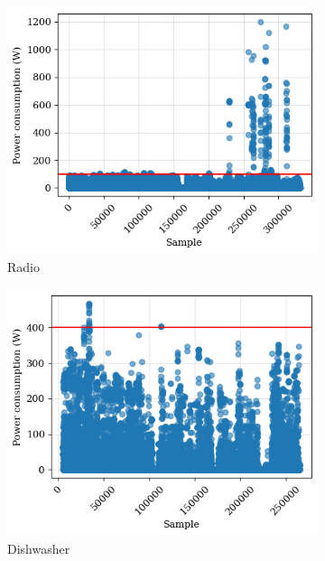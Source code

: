 

\begin{figure}
  \begin{subfigure}{.5\textwidth}
    \centering
    \includegraphics[width=.9\linewidth]{images/raw_consumptions/audio_amplifier.png}
    \caption{Radio}
    \label{fig:radio}
  \end{subfigure}%
  \begin{subfigure}{.5\textwidth}
    \centering
    \includegraphics[width=.9\linewidth]{images/raw_consumptions/dish_washer.png}
    \caption{Dishwasher}
    \label{fig:dish_washer}
  \end{subfigure}
  \begin{subfigure}{.5\textwidth}
    \centering

\end{subfigure}
\end{figure}

